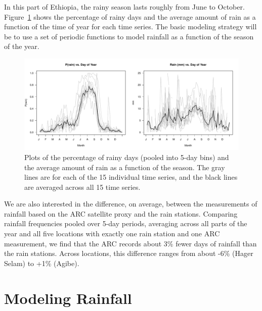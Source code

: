 \documentclass[12pt]{article}
\begin{document}
In this part of Ethiopia, the rainy season lasts roughly from June to October. Figure~\ref{fig_eda} shows the percentage of rainy days and the average amount of rain as a function of the time of year for each time series. The basic modeling strategy will be to use a set of periodic functions to model rainfall as a function of the season of the year.
\begin{figure}[ht]
\begin{center}
\includegraphics[width=6.5in]{fig_eda.pdf}
\caption{Plots of the percentage of rainy days (pooled into 5-day bins) and the average amount of rain as a function of the season. The gray lines are for each of the 15 individual time series, and the black lines are averaged across all 15 time series.}
\label{fig_eda}
\end{center}
\end{figure}

We are also interested in the difference, on average, between the measurements of rainfall based on the ARC satellite proxy and the rain stations. Comparing rainfall frequencies pooled over 5-day periods, averaging across all parts of the year and all five locations with exactly one rain station and one ARC measurement, we find that the ARC records about 3\% fewer days of rainfall than the rain stations. Across locations, this difference ranges from about -6\% (Hager Selam) to  +1\% (Agibe).

\section{Modeling Rainfall}
\label{sec:model}
\end{document}
